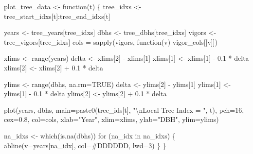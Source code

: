 \documentclass[
  letterpaper,
  DIV=11,
  numbers=noendperiod]{scrartcl}
\newenvironment{Shaded}{\begin{snugshade}}{\end{snugshade}}
\newcommand{\AttributeTok}[1]{\textcolor[rgb]{0.40,0.45,0.13}{#1}}
\newcommand{\ConstantTok}[1]{\textcolor[rgb]{0.56,0.35,0.01}{#1}}
\newcommand{\ControlFlowTok}[1]{\textcolor[rgb]{0.00,0.23,0.31}{#1}}
\newcommand{\DecValTok}[1]{\textcolor[rgb]{0.68,0.00,0.00}{#1}}
\newcommand{\FloatTok}[1]{\textcolor[rgb]{0.68,0.00,0.00}{#1}}
\newcommand{\FunctionTok}[1]{\textcolor[rgb]{0.28,0.35,0.67}{#1}}
\newcommand{\NormalTok}[1]{\textcolor[rgb]{0.00,0.23,0.31}{#1}}
\newcommand{\OtherTok}[1]{\textcolor[rgb]{0.00,0.23,0.31}{#1}}
\newcommand{\SpecialCharTok}[1]{\textcolor[rgb]{0.37,0.37,0.37}{#1}}
\newcommand{\StringTok}[1]{\textcolor[rgb]{0.13,0.47,0.30}{#1}}
\begin{document}
\begin{Shaded}
\begin{Highlighting}[]
\NormalTok{plot\_tree\_data }\OtherTok{\textless{}{-}} \ControlFlowTok{function}\NormalTok{(t) \{}
\NormalTok{  tree\_idxs }\OtherTok{\textless{}{-}}\NormalTok{ tree\_start\_idxs[t]}\SpecialCharTok{:}\NormalTok{tree\_end\_idxs[t]}

\NormalTok{  years }\OtherTok{\textless{}{-}}\NormalTok{ tree\_years[tree\_idxs]}
\NormalTok{  dbhs }\OtherTok{\textless{}{-}}\NormalTok{ tree\_dbhs[tree\_idxs]}
\NormalTok{  vigors }\OtherTok{\textless{}{-}}\NormalTok{ tree\_vigors[tree\_idxs]}
\NormalTok{  cols }\OtherTok{=} \FunctionTok{sapply}\NormalTok{(vigors, }\ControlFlowTok{function}\NormalTok{(v) vigor\_cols[[v]])}

\NormalTok{  xlims }\OtherTok{\textless{}{-}} \FunctionTok{range}\NormalTok{(years)}
\NormalTok{  delta }\OtherTok{\textless{}{-}}\NormalTok{ xlims[}\DecValTok{2}\NormalTok{] }\SpecialCharTok{{-}}\NormalTok{ xlims[}\DecValTok{1}\NormalTok{]}
\NormalTok{  xlims[}\DecValTok{1}\NormalTok{] }\OtherTok{\textless{}{-}}\NormalTok{ xlims[}\DecValTok{1}\NormalTok{] }\SpecialCharTok{{-}} \FloatTok{0.1} \SpecialCharTok{*}\NormalTok{ delta}
\NormalTok{  xlims[}\DecValTok{2}\NormalTok{] }\OtherTok{\textless{}{-}}\NormalTok{ xlims[}\DecValTok{2}\NormalTok{] }\SpecialCharTok{+} \FloatTok{0.1} \SpecialCharTok{*}\NormalTok{ delta}

\NormalTok{  ylims }\OtherTok{\textless{}{-}} \FunctionTok{range}\NormalTok{(dbhs, }\AttributeTok{na.rm=}\ConstantTok{TRUE}\NormalTok{)}
\NormalTok{  delta }\OtherTok{\textless{}{-}}\NormalTok{ ylims[}\DecValTok{2}\NormalTok{] }\SpecialCharTok{{-}}\NormalTok{ ylims[}\DecValTok{1}\NormalTok{]}
\NormalTok{  ylims[}\DecValTok{1}\NormalTok{] }\OtherTok{\textless{}{-}}\NormalTok{ ylims[}\DecValTok{1}\NormalTok{] }\SpecialCharTok{{-}} \FloatTok{0.1} \SpecialCharTok{*}\NormalTok{ delta}
\NormalTok{  ylims[}\DecValTok{2}\NormalTok{] }\OtherTok{\textless{}{-}}\NormalTok{ ylims[}\DecValTok{2}\NormalTok{] }\SpecialCharTok{+} \FloatTok{0.1} \SpecialCharTok{*}\NormalTok{ delta}

  \FunctionTok{plot}\NormalTok{(years, dbhs,}
       \AttributeTok{main=}\FunctionTok{paste0}\NormalTok{(tree\_ids[t], }\StringTok{"}\SpecialCharTok{\textbackslash{}n}\StringTok{Local Tree Index = "}\NormalTok{, t),}
       \AttributeTok{pch=}\DecValTok{16}\NormalTok{, }\AttributeTok{cex=}\FloatTok{0.8}\NormalTok{, }\AttributeTok{col=}\NormalTok{cols,}
       \AttributeTok{xlab=}\StringTok{"Year"}\NormalTok{, }\AttributeTok{xlim=}\NormalTok{xlims, }\AttributeTok{ylab=}\StringTok{"DBH"}\NormalTok{, }\AttributeTok{ylim=}\NormalTok{ylims)}

\NormalTok{  na\_idxs }\OtherTok{\textless{}{-}} \FunctionTok{which}\NormalTok{(}\FunctionTok{is.na}\NormalTok{(dbhs))}
  \ControlFlowTok{for}\NormalTok{ (na\_idx }\ControlFlowTok{in}\NormalTok{ na\_idxs) \{}
    \FunctionTok{abline}\NormalTok{(}\AttributeTok{v=}\NormalTok{years[na\_idx], }\AttributeTok{col=}\StringTok{\textquotesingle{}\#DDDDDD\textquotesingle{}}\NormalTok{, }\AttributeTok{lwd=}\DecValTok{3}\NormalTok{)}
\NormalTok{  \}}
\NormalTok{\}}
\end{Highlighting}
\end{Shaded}
\end{document}
